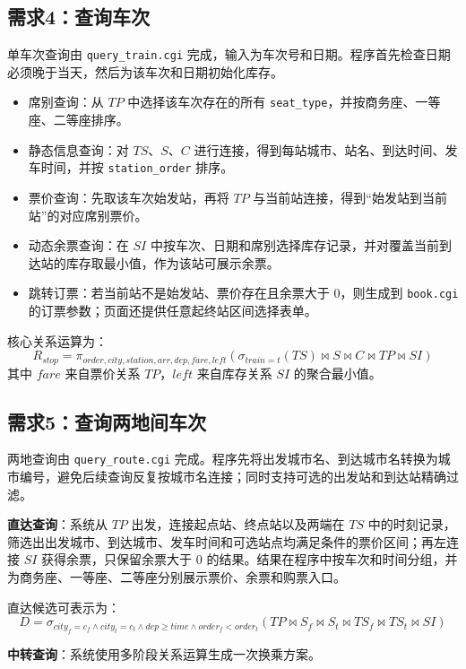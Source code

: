 \documentclass[10pt,a4paper]{article}
\begin{document}
\subsection{需求4：查询车次}

单车次查询由 \texttt{query\_train.cgi} 完成，输入为车次号和日期。程序首先检查日期必须晚于当天，然后为该车次和日期初始化库存。

\begin{itemize}
    \item 席别查询：从 $TP$ 中选择该车次存在的所有 \texttt{seat\_type}，并按商务座、一等座、二等座排序。
    \item 静态信息查询：对 $TS$、$S$、$C$ 进行连接，得到每站城市、站名、到达时间、发车时间，并按 \texttt{station\_order} 排序。
    \item 票价查询：先取该车次始发站，再将 $TP$ 与当前站连接，得到“始发站到当前站”的对应席别票价。
    \item 动态余票查询：在 $SI$ 中按车次、日期和席别选择库存记录，并对覆盖当前到达站的库存取最小值，作为该站可展示余票。
    \item 跳转订票：若当前站不是始发站、票价存在且余票大于 0，则生成到 \texttt{book.cgi} 的订票参数；页面还提供任意起终站区间选择表单。
\end{itemize}

核心关系运算为：
\[
R_{stop}=\pi_{order,city,station,arr,dep,fare,left}
(\sigma_{train=t}(TS) \bowtie S \bowtie C \bowtie TP \bowtie SI)
\]
其中 $fare$ 来自票价关系 $TP$，$left$ 来自库存关系 $SI$ 的聚合最小值。

\subsection{需求5：查询两地间车次}

两地查询由 \texttt{query\_route.cgi} 完成。程序先将出发城市名、到达城市名转换为城市编号，避免后续查询反复按城市名连接；同时支持可选的出发站和到达站精确过滤。

\textbf{直达查询}：系统从 $TP$ 出发，连接起点站、终点站以及两端在 $TS$ 中的时刻记录，筛选出出发城市、到达城市、发车时间和可选站点均满足条件的票价区间；再左连接 $SI$ 获得余票，只保留余票大于 0 的结果。结果在程序中按车次和时间分组，并为商务座、一等座、二等座分别展示票价、余票和购票入口。

直达候选可表示为：
\[
D=\sigma_{city_f=c_f \land city_t=c_t \land dep\geq time \land order_f<order_t}
(TP \bowtie S_f \bowtie S_t \bowtie TS_f \bowtie TS_t \bowtie SI)
\]

\textbf{中转查询}：系统使用多阶段关系运算生成一次换乘方案。
\end{document}
